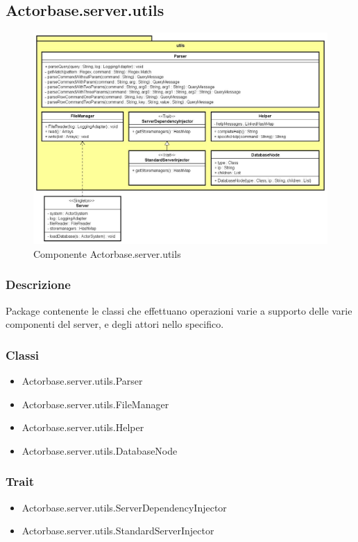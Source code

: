 \documentclass[a4paper]{article}
\begin{document}
		\subsection{Actorbase.server.utils}
		
			\begin{figure} [H]
				\centering
				\includegraphics[width=\textwidth]{ST/Server/utilsLevel.jpg}
				\caption{Componente Actorbase.server.utils}
			\end{figure}
			
			\subsubsection{Descrizione}
				Package contenente le classi che effettuano operazioni varie a supporto delle varie componenti del server, e degli attori nello specifico.
				
			\subsubsection{Classi}
				\begin{itemize}
					\item Actorbase.server.utils.Parser
					\item Actorbase.server.utils.FileManager
					\item Actorbase.server.utils.Helper
					\item Actorbase.server.utils.DatabaseNode
				\end{itemize}
				
			\subsubsection{Trait}
				\begin{itemize}
					\item Actorbase.server.utils.ServerDependencyInjector
					\item Actorbase.server.utils.StandardServerInjector
				\end{itemize}
				
\end{document}
